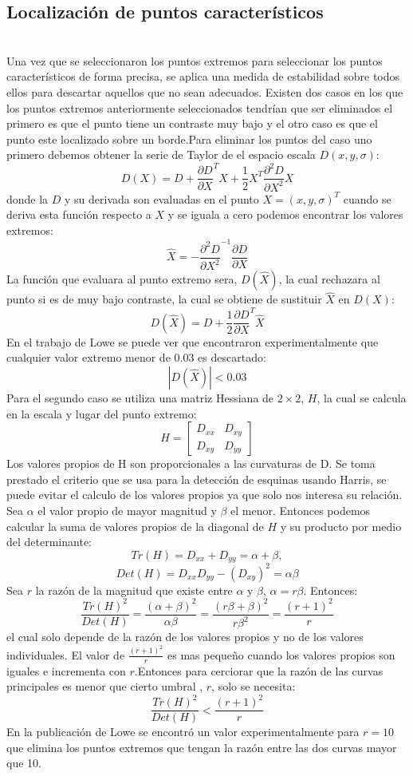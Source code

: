 	\subsection{Localización de puntos característicos} \hfill \\  %
		Una vez que se seleccionaron los puntos extremos para seleccionar  los  puntos  característicos de forma precisa, se aplica una medida de estabilidad sobre todos ellos para descartar aquellos que no sean adecuados. Existen dos casos en los que los puntos extremos anteriormente seleccionados tendrían que ser eliminados  el primero es que el punto tiene un contraste muy bajo y el otro caso es que el punto este localizado sobre un borde.Para eliminar los puntos del caso uno primero debemos obtener la serie de Taylor de el espacio escala $D(x,y,\sigma)$:
		$$D(X)=D +\frac{\partial D}{\partial X}^T X+ \frac{1}{2} X^T\frac{\partial^2 D}{\partial X^2} X $$
		donde la $D$ y su derivada son evaluadas en el punto $X = (x,y,\sigma)^T$ cuando se deriva esta función respecto a $X$ y se iguala a cero podemos encontrar los valores extremos: 
	    $$ \hat{X} = - \frac{\partial^2 D}{\partial X^2}^{-1}\frac{\partial D}{\partial X}$$
	 	La función que evaluara al punto extremo sera, $D(\hat{X})$, la cual rechazara al punto si es de muy bajo contraste, la cual se obtiene de sustituir $\hat{X}$ en $D(X)$:
	 	$$D(\hat{X})=D + \frac{1}{2} \frac{\partial D}{\partial X}^T \hat{X} $$ 	 
	 	En el trabajo de Lowe \cite{Lowe2004} se  puede ver que encontraron experimentalmente que cualquier valor extremo menor de 0.03 es descartado:
	 	$$ |D(\hat{X})|< 0.03$$ 	 
	 	Para el segundo caso se utiliza una matriz Hessiana de $2\times2$, $H$, la cual se calcula en la escala y lugar del punto extremo:
		$$ 
		H
		=
		\begin{bmatrix}
			D_{xx} & D_{xy}\\
    		D_{xy} & D_{yy}
		\end{bmatrix}		 	
		$$	
		Los valores propios de H son proporcionales a las curvaturas de D. Se toma prestado el criterio que se usa para la detección de esquinas usando Harris, se puede evitar el calculo de los valores propios ya que solo nos interesa su relación. Sea $\alpha$ el valor propio de mayor magnitud y $\beta$ el menor. Entonces podemos calcular la suma de valores propios de la diagonal de $H$ y su producto por medio del determinante:
		$$Tr(H) = D_{xx} + D_{yy} = \alpha+\beta,$$ $$Det(H) = D_{xx}D_{yy}-(D_{xy})^2= \alpha\beta$$
		Sea $r$ la razón de la magnitud que existe entre $\alpha$ y $\beta$, $\alpha = r\beta$. Entonces:
		$$\frac{Tr(H)^2}{Det(H)}= \frac{(\alpha+\beta)^2}{\alpha\beta}= \frac{(r\beta+\beta)^2}{r\beta^2}= \frac{(r+1)^2}{r}$$
		el cual solo depende de la razón de los valores propios y no de los valores individuales. El valor de $\frac{(r+1)^2}{r}$ es mas pequeño cuando los valores propios son iguales e incrementa con $r$.Entonces para cerciorar que la razón de las curvas principales es menor que cierto umbral , $r$, solo se necesita:
		$$\frac{Tr(H)^2}{Det(H)} < \frac{(r+1)^2}{r}$$
		En la publicación de Lowe \cite{Lowe2004} se encontró un valor experimentalmente para $r=10$ que elimina los puntos extremos que tengan la razón entre las dos curvas mayor que 10.
	
